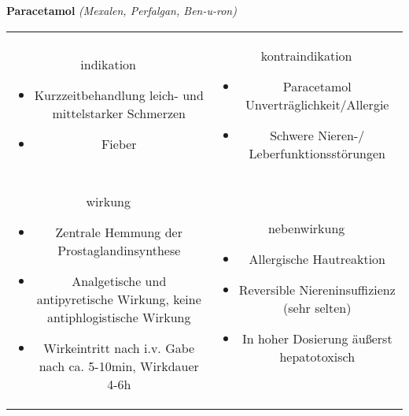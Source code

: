 \begin{frame}{
    \textbf{Paracetamol}
    \textit{(Mexalen, Perfalgan, Ben-u-ron)}
}
    \begin{tabular}{c c}
        \begin{beamercolorbox}[wd=\boxwidth\textwidth,ht=\boxheight\textheight,sep=1em]{indikation}
            \begin{itemize}
                \item Kurzzeitbehandlung leich- und mittelstarker Schmerzen
                \item Fieber	
            \end{itemize}
        \end{beamercolorbox} & 
        \begin{beamercolorbox}[wd=\boxwidth\textwidth,ht=\boxheight\textheight,sep=1em]{kontraindikation}
            \begin{itemize}
                \item Paracetamol Unverträglichkeit/Allergie
                \item Schwere Nieren-/ Leberfunktionsstörungen
            \end{itemize}
        \end{beamercolorbox} \\
        \begin{beamercolorbox}[wd=\boxwidth\textwidth,ht=\boxheight\textheight,sep=1em]{wirkung}
            \scriptsize
            \begin{itemize}
                \item Zentrale Hemmung der Prostaglandinsynthese
                \item Analgetische und antipyretische Wirkung, keine antiphlogistische Wirkung
                \item Wirkeintritt nach i.v. Gabe nach ca. 5-10min, Wirkdauer 4-6h
            \end{itemize}
        \end{beamercolorbox} & 
        \begin{beamercolorbox}[wd=\boxwidth\textwidth,ht=\boxheight\textheight,sep=1em]{nebenwirkung}
            \begin{itemize}
                \item Allergische Hautreaktion
                \item Reversible Niereninsuffizienz (sehr selten)
                \item In hoher Dosierung äußerst hepatotoxisch
            \end{itemize}
        \end{beamercolorbox} \\
    \end{tabular}
\end{frame}


